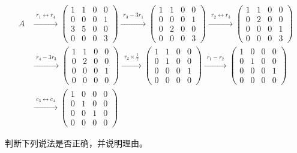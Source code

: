 \documentclass[a4paper]{report}
\begin{document}
\begin{jie}
\begin{align*}
A&\xrightarrow{\substack{r_{1}\leftrightarrow r_{4}}}
{
\begin{pmatrix}
1&1&0&0\\
0&0&0&1\\
3&5&0&0\\
0&0&0&3
\end{pmatrix}
}\xrightarrow{\substack{r_{3}-3r_{1}}}
{
\begin{pmatrix}
1&1&0&0\\
0&0&0&1\\
0&2&0&0\\
0&0&0&3
\end{pmatrix}
}\xrightarrow{\substack{r_{2}\leftrightarrow r_{3}}}
{
\begin{pmatrix}
1&1&0&0\\
0&2&0&0\\
0&0&0&1\\
0&0&0&3
\end{pmatrix}
}\\ &\xrightarrow{\substack{r_{4}-3r_{3}}}
{
\begin{pmatrix}
1&1&0&0\\
0&2&0&0\\
0&0&0&1\\
0&0&0&0
\end{pmatrix}
}\xrightarrow{\substack{r_{2}\times \frac{1}{2}}}
{
\begin{pmatrix}
1&1&0&0\\
0&1&0&0\\
0&0&0&1\\
0&0&0&0
\end{pmatrix}
}\xrightarrow{\substack{r_{1}-r_{2}}}
{
\begin{pmatrix}
1&0&0&0\\
0&1&0&0\\
0&0&0&1\\
0&0&0&0
\end{pmatrix}
}\\ &\xrightarrow{\substack{c_{3}\leftrightarrow c_{4}}}
{
\begin{pmatrix}
1&0&0&0\\
0&1&0&0\\
0&0&1&0\\
0&0&0&0
\end{pmatrix}
}
\end{align*}
\end{jie}

\EX 判断下列说法是否正确，并说明理由。
\end{document}
